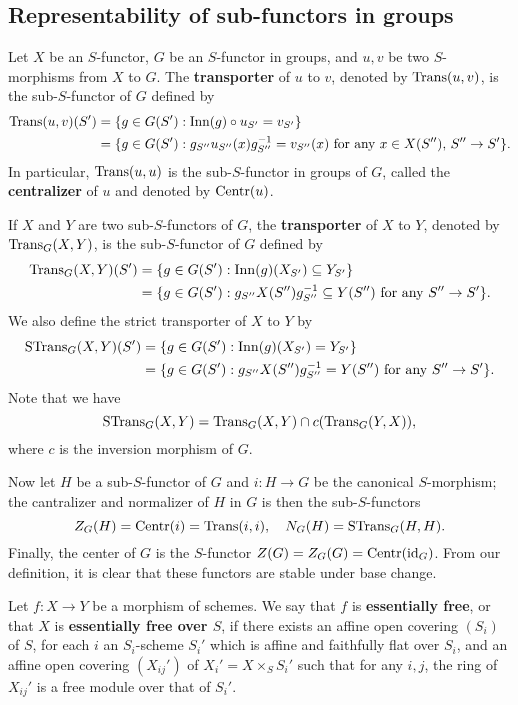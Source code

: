 \subsection{Representability of sub-functors in groups}\label{sheme functor representability of Res subsection}
Let $X$ be an $S$-functor, $G$ be an $S$-functor in groups, and $u,v$ be two $S$-morphisms from $X$ to $G$. The \textbf{transporter} of $u$ to $v$, denoted by $\mathrm{Trans}(u,v)$, is the sub-$S$-functor of $G$ defined by
\begin{align*}
\mathrm{Trans}(u,v)(S')&=\{g\in G(S'):\mathrm{Inn}(g)\circ u_{S'}=v_{S'}\}\\
&=\{g\in G(S'):\text{$g_{S''}u_{S''}(x)g_{S''}^{-1}=v_{S''}(x)$ for any $x\in X(S'')$, $S''\to S'$}\}.
\end{align*}
In particular, $\mathrm{Trans}(u,u)$ is the sub-$S$-functor in groups of $G$, called the \textbf{centralizer} of $u$ and denoted by $\mathrm{Centr}(u)$.\par
If $X$ and $Y$ are two sub-$S$-functors of $G$, the \textbf{transporter} of $X$ to $Y$, denoted by $\mathrm{Trans}_G(X,Y)$, is the sub-$S$-functor of $G$ defined by
\begin{align*}
\mathrm{Trans}_G(X,Y)(S')&=\{g\in G(S'):\mathrm{Inn}(g)(X_{S'})\subseteq Y_{S'}\}\\
&=\{g\in G(S'):\text{$g_{S''}X(S'')g_{S''}^{-1}\subseteq Y(S'')$ for any $S''\to S'$}\}.
\end{align*}
We also define the strict transporter of $X$ to $Y$ by
\begin{align*}
\mathrm{STrans}_G(X,Y)(S')&=\{g\in G(S'):\mathrm{Inn}(g)(X_{S'})=Y_{S'}\}\\
&=\{g\in G(S'):\text{$g_{S''}X(S'')g_{S''}^{-1}=Y(S'')$ for any $S''\to S'$}\}.
\end{align*}
Note that we have
\[\mathrm{STrans}_G(X,Y)=\mathrm{Trans}_G(X,Y)\cap c(\mathrm{Trans}_G(Y,X)),\]
where $c$ is the inversion morphism of $G$.\par
Now let $H$ be a sub-$S$-functor of $G$ and $i:H\to G$ be the canonical $S$-morphism; the cantralizer and normalizer of $H$ in $G$ is then the sub-$S$-functors
\[Z_G(H)=\mathrm{Centr}(i)=\mathrm{Trans}(i,i),\quad N_G(H)=\mathrm{STrans}_G(H,H).\]
Finally, the center of $G$ is the $S$-functor $Z(G)=Z_G(G)=\mathrm{Centr}(\operatorname{id}_G)$. From our definition, it is clear that these functors are stable under base change.

\begin{definition}\label{scheme morphism essentially free definition}
Let $f:X\to Y$ be a morphism of schemes. We say that $f$ is \textbf{essentially free}, or that $X$ is \textbf{essentially free over $S$}, if there exists an affine open covering $(S_i)$ of $S$, for each $i$ an $S_i$-scheme $S_i'$ which is affine and faithfully flat over $S_i$, and an affine open covering $(X_{ij}')$ of $X_i'=X\times_SS_i'$ such that for any $i,j$, the ring of $X_{ij}'$ is a free module over that of $S_i'$.
\end{definition}

